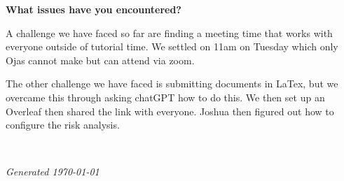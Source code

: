 \documentclass[11pt,a4paper]{article}
\begin{document}
\textbf{What issues have you encountered?}


A challenge we have faced so far are finding a meeting time that works with everyone outside of tutorial time. We settled on 11am on Tuesday which only Ojas cannot make but can attend via zoom.

The other challenge we have faced is submitting documents in LaTex, but we overcame this through asking chatGPT how to do this. We then set up an Overleaf then shared the link with everyone. Joshua then figured out how to configure the risk analysis. 

~\vfill

\noindent \textit{Generated \today}
\end{document}
